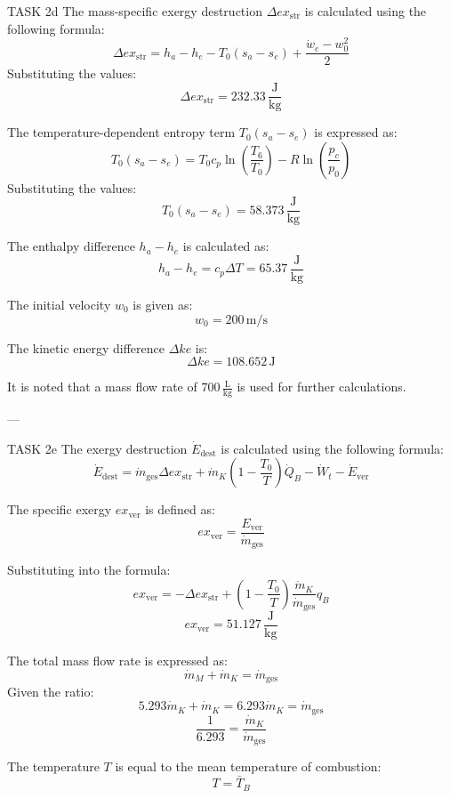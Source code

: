 TASK 2d  
The mass-specific exergy destruction \( \Delta ex_{\text{str}} \) is calculated using the following formula:  
\[
\Delta ex_{\text{str}} = h_a - h_e - T_0 (s_a - s_e) + \frac{\dot{w}_e - w_0^2}{2}
\]  
Substituting the values:  
\[
\Delta ex_{\text{str}} = 232.33 \, \frac{\text{J}}{\text{kg}}
\]  

The temperature-dependent entropy term \( T_0(s_a - s_e) \) is expressed as:  
\[
T_0(s_a - s_e) = T_0 c_p \ln \left( \frac{T_6}{T_0} \right) - R \ln \left( \frac{p_c}{p_0} \right)
\]  
Substituting the values:  
\[
T_0(s_a - s_e) = 58.373 \, \frac{\text{J}}{\text{kg}}
\]  

The enthalpy difference \( h_a - h_e \) is calculated as:  
\[
h_a - h_e = c_p \Delta T = 65.37 \, \frac{\text{J}}{\text{kg}}
\]  

The initial velocity \( w_0 \) is given as:  
\[
w_0 = 200 \, \text{m/s}
\]  

The kinetic energy difference \( \Delta ke \) is:  
\[
\Delta ke = 108.652 \, \text{J}
\]  

It is noted that a mass flow rate of \( 700 \, \frac{\text{L}}{\text{kg}} \) is used for further calculations.

---

TASK 2e  
The exergy destruction \( \dot{E}_{\text{dest}} \) is calculated using the following formula:  
\[
\dot{E}_{\text{dest}} = \dot{m}_{\text{ges}} \Delta ex_{\text{str}} + \dot{m}_K \left( 1 - \frac{T_0}{T} \right) \dot{Q}_B - \dot{W}_t - \dot{E}_{\text{ver}}
\]  

The specific exergy \( ex_{\text{ver}} \) is defined as:  
\[
ex_{\text{ver}} = \frac{E_{\text{ver}}}{\dot{m}_{\text{ges}}}
\]  

Substituting into the formula:  
\[
ex_{\text{ver}} = -\Delta ex_{\text{str}} + \left( 1 - \frac{T_0}{T} \right) \frac{\dot{m}_K}{\dot{m}_{\text{ges}}} q_B
\]  
\[
ex_{\text{ver}} = 51.127 \, \frac{\text{J}}{\text{kg}}
\]  

The total mass flow rate is expressed as:  
\[
\dot{m}_M + \dot{m}_K = \dot{m}_{\text{ges}}
\]  
Given the ratio:  
\[
5.293 \dot{m}_K + \dot{m}_K = 6.293 \dot{m}_K = \dot{m}_{\text{ges}}
\]  
\[
\frac{1}{6.293} = \frac{\dot{m}_K}{\dot{m}_{\text{ges}}}
\]  

The temperature \( T \) is equal to the mean temperature of combustion:  
\[
T = \bar{T}_B
\]